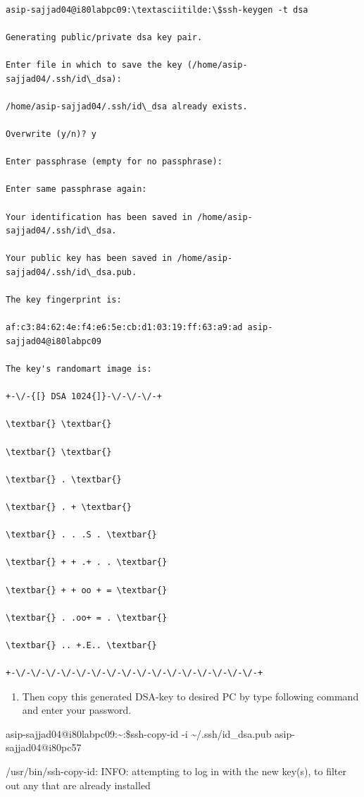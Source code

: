 \documentclass[
]{article}
\begin{document}
\begin{lstlisting}

asip-sajjad04@i80labpc09:\textasciitilde:\$ssh-keygen -t dsa

Generating public/private dsa key pair.

Enter file in which to save the key (/home/asip-sajjad04/.ssh/id\_dsa):

/home/asip-sajjad04/.ssh/id\_dsa already exists.

Overwrite (y/n)? y

Enter passphrase (empty for no passphrase):

Enter same passphrase again:

Your identification has been saved in /home/asip-sajjad04/.ssh/id\_dsa.

Your public key has been saved in /home/asip-sajjad04/.ssh/id\_dsa.pub.

The key fingerprint is:

af:c3:84:62:4e:f4:e6:5e:cb:d1:03:19:ff:63:a9:ad asip-sajjad04@i80labpc09

The key's randomart image is:

+-\/-{[} DSA 1024{]}-\/-\/-\/-+

\textbar{} \textbar{}

\textbar{} \textbar{}

\textbar{} . \textbar{}

\textbar{} . + \textbar{}

\textbar{} . . .S . \textbar{}

\textbar{} + + .+ . . \textbar{}

\textbar{} + + oo + = \textbar{}

\textbar{} . .oo+ = . \textbar{}

\textbar{} .. +.E.. \textbar{}

+-\/-\/-\/-\/-\/-\/-\/-\/-\/-\/-\/-\/-\/-\/-\/-\/-+
\end{lstlisting}
\begin{enumerate}
\def\labelenumi{\arabic{enumi}.}
\setcounter{enumi}{10}
\item
  Then copy this generated DSA-key to desired PC by type following
  command and enter your password.
\end{enumerate}

asip-sajjad04@i80labpc09:\textasciitilde:\$ssh-copy-id -i
\textasciitilde/.ssh/id\_dsa.pub asip-sajjad04@i80pc57

/usr/bin/ssh-copy-id: INFO: attempting to log in with the new key(s), to
filter out any that are already installed
\end{document}
